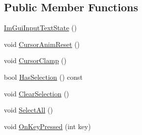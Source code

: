 \subsection*{Public Member Functions}
\begin{DoxyCompactItemize}
\item 
\mbox{\hyperlink{struct_im_gui_input_text_state_adc973b2e610237bdbede8e1fc01dcc5f}{Im\+Gui\+Input\+Text\+State}} ()
\item 
void \mbox{\hyperlink{struct_im_gui_input_text_state_a78a05f36dbfd38b9026a4980a15a6a3e}{Cursor\+Anim\+Reset}} ()
\item 
void \mbox{\hyperlink{struct_im_gui_input_text_state_a0924f1eead76c7d58090aa603cea4301}{Cursor\+Clamp}} ()
\item 
bool \mbox{\hyperlink{struct_im_gui_input_text_state_ab17832413ff121a5663319c06bbb989a}{Has\+Selection}} () const
\item 
void \mbox{\hyperlink{struct_im_gui_input_text_state_aa834c6b6c9f3d589b55eb22ca9a01c3e}{Clear\+Selection}} ()
\item 
void \mbox{\hyperlink{struct_im_gui_input_text_state_ac9ceb16a3551dc82a1e8be716236b811}{Select\+All}} ()
\item 
void \mbox{\hyperlink{struct_im_gui_input_text_state_a2cd5083f820d0012479bb706a45b04b0}{On\+Key\+Pressed}} (int key)
\end{DoxyCompactItemize}
